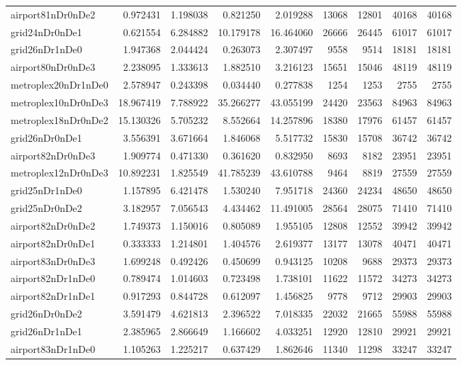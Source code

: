 \begin{longtable}{|l|r|r|r|r|r|r|r|r|}
airport81nDr0nDe2 & 0.972431 & 1.198038 & 0.821250 & 2.019288 & 13068 & 12801 & 40168 & 40168 \\
grid24nDr0nDe1 & 0.621554 & 6.284882 & 10.179178 & 16.464060 & 26666 & 26445 & 61017 & 61017 \\
grid26nDr1nDe0 & 1.947368 & 2.044424 & 0.263073 & 2.307497 & 9558 & 9514 & 18181 & 18181 \\
airport80nDr0nDe3 & 2.238095 & 1.333613 & 1.882510 & 3.216123 & 15651 & 15046 & 48119 & 48119 \\
metroplex20nDr1nDe0 & 2.578947 & 0.243398 & 0.034440 & 0.277838 & 1254 & 1253 & 2755 & 2755 \\
metroplex10nDr0nDe3 & 18.967419 & 7.788922 & 35.266277 & 43.055199 & 24420 & 23563 & 84963 & 84963 \\
metroplex18nDr0nDe2 & 15.130326 & 5.705232 & 8.552664 & 14.257896 & 18380 & 17976 & 61457 & 61457 \\
grid26nDr0nDe1 & 3.556391 & 3.671664 & 1.846068 & 5.517732 & 15830 & 15708 & 36742 & 36742 \\
airport82nDr0nDe3 & 1.909774 & 0.471330 & 0.361620 & 0.832950 & 8693 & 8182 & 23951 & 23951 \\
metroplex12nDr0nDe3 & 10.892231 & 1.825549 & 41.785239 & 43.610788 & 9464 & 8819 & 27559 & 27559 \\
grid25nDr1nDe0 & 1.157895 & 6.421478 & 1.530240 & 7.951718 & 24360 & 24234 & 48650 & 48650 \\
grid25nDr0nDe2 & 3.182957 & 7.056543 & 4.434462 & 11.491005 & 28564 & 28075 & 71410 & 71410 \\
airport82nDr0nDe2 & 1.749373 & 1.150016 & 0.805089 & 1.955105 & 12808 & 12552 & 39942 & 39942 \\
airport82nDr0nDe1 & 0.333333 & 1.214801 & 1.404576 & 2.619377 & 13177 & 13078 & 40471 & 40471 \\
airport83nDr0nDe3 & 1.699248 & 0.492426 & 0.450699 & 0.943125 & 10208 & 9688 & 29373 & 29373 \\
airport82nDr1nDe0 & 0.789474 & 1.014603 & 0.723498 & 1.738101 & 11622 & 11572 & 34273 & 34273 \\
airport82nDr1nDe1 & 0.917293 & 0.844728 & 0.612097 & 1.456825 & 9778 & 9712 & 29903 & 29903 \\
grid26nDr0nDe2 & 3.591479 & 4.621813 & 2.396522 & 7.018335 & 22032 & 21665 & 55988 & 55988 \\
grid26nDr1nDe1 & 2.385965 & 2.866649 & 1.166602 & 4.033251 & 12920 & 12810 & 29921 & 29921 \\
airport83nDr1nDe0 & 1.105263 & 1.225217 & 0.637429 & 1.862646 & 11340 & 11298 & 33247 & 33247 \\

\end{longtable}
